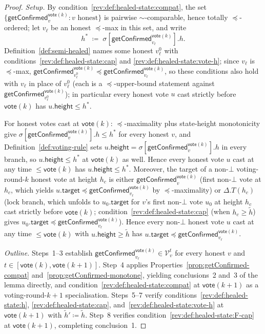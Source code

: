 \ifx\litemode\undefined\documentclass{article}\fi
\newcommand{\V}[0]{\ensuremath{\mathcal{V}}}
\newcommand{\target}{\mathsf{target}}
\newcommand{\height}{\mathsf{height}}
\newcommand{\vote}{\ensuremath{\mathsf{vote}}}
\newcommand{\comm}[1]{\ensuremath{\widetilde{#1}}}
\newcommand{\getConfirmed}{\textsf{getConfirmed}\xspace}
\theoremstyle{plain}
\theoremstyle{definition}
\theoremstyle{remark}
\begin{document}
\begin{proof}

\emph{Setup.}
By condition~\ref{rev:def:healed-state:compat}, the set $\{\getConfirmed_v^{\vote(k)} : v \text{ honest}\}$ is pairwise $\sim$-comparable, hence totally $\preceq$-ordered;
let $v_\ell$ be an honest $\preceq$-max in this set, and write
\[
  h^\ast \;\coloneqq\; \sigma[\getConfirmed_{v_\ell}^{\vote(k)}].h.
\]
Definition~\ref{def:semi-healed} names some honest $v_\ell^0$ with conditions~\ref{rev:def:healed-state:cap} and \ref{rev:def:healed-state:vote-h};
since $v_\ell$ is $\preceq$-max, $\getConfirmed_{v_\ell^0}^{\vote(k)} \preceq \getConfirmed_{v_\ell}^{\vote(k)}$, so these conditions also hold with $v_\ell$ in place of $v_\ell^0$ (each is a $\preceq$-upper-bound statement against $\getConfirmed_{v_\ell^0}^{\vote(k)}$);
in particular every honest vote $u$ cast strictly before $\vote(k)$ has $u.\height \leq h^\ast$.

For honest votes cast at $\vote(k)$:
$\preceq$-maximality plus state-height monotonicity give $\sigma[\getConfirmed_v^{\vote(k)}].h \leq h^\ast$ for every honest $v$, and Definition~\ref{def:voting-rule} sets $u.\height = \sigma[\getConfirmed_v^{\vote(k)}].h$ in every branch, so $u.\height \leq h^\ast$ at $\vote(k)$ as well.
Hence every honest vote $u$ cast at any time $\leq \vote(k)$ has $u.\height \leq h^\ast$.
Moreover, the target of a non-$\bot$ voting-round-$k$ honest vote at height $h_c$ is either $\getConfirmed_v^{\vote(k)}$ (first non-$\bot$ vote at $h_c$, which yields $u.\target \preceq \getConfirmed_{v_\ell}^{\vote(k)}$ by $\preceq$-maximality) or $\Delta.T(h_c)$ (lock branch, which unfolds to $u_0.\target$ for $v$'s first non-$\bot$ vote $u_0$ at height $h_c$ cast strictly before $\vote(k)$; condition~\ref{rev:def:healed-state:cap} (when $h_c \geq \comm{h}$) gives $u_0.\target \preceq \getConfirmed_{v_\ell}^{\vote(k)}$).
Hence every non-$\bot$ honest vote $u$ cast at any time $\leq \vote(k)$ with $u.\height \geq \comm{h}$ has $u.\target \preceq \getConfirmed_{v_\ell}^{\vote(k)}$.

\emph{Outline.}
Steps~1--3 establish $\getConfirmed_{v_\ell}^{\vote(k)} \in \V_v^t$ for every honest $v$ and $t \in [\vote(k), \vote(k{+}1)]$.
Step~4 applies Properties~\ref{prop:getConfirmed-compat} and~\ref{prop:getConfirmed-monotone}, yielding conclusions~2 and~3 of the lemma directly, and condition~\ref{rev:def:healed-state:compat} at $\vote(k{+}1)$ as a voting-round-$k{+}1$ specialisation.
Steps~5--7 verify conditions~\ref{rev:def:healed-state:h}, \ref{rev:def:healed-state:cap}, and~\ref{rev:def:healed-state:vote-h} at $\vote(k{+}1)$ with $\comm{h}' \coloneqq \comm{h}$.
Step~8 verifies condition~\ref{rev:def:healed-state:F-cap} at $\vote(k{+}1)$, completing conclusion~1.


\end{proof}
\end{document}
